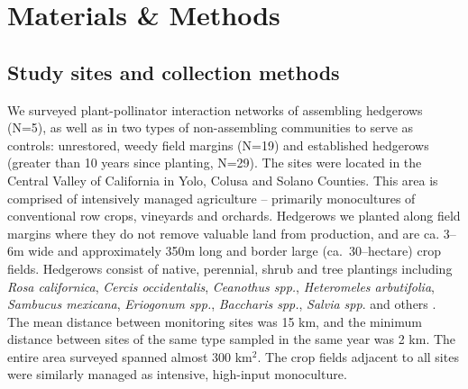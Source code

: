 \documentclass[12pt]{article}
\begin{document}




\section*{Materials \& Methods}
\label{sec:methods}

\subsection*{Study sites and collection methods}
\label{sec:study-sites}

We surveyed plant-pollinator interaction networks of assembling
hedgerows (N=5), as well as in two types of non-assembling communities
to serve as controls: unrestored, weedy field margins (N=19) and
established hedgerows (greater than 10 years since planting,
N=29). The sites were located in the Central Valley of California in
Yolo, Colusa and Solano Counties. This area is comprised of
intensively managed agriculture -- primarily monocultures of
conventional row crops, vineyards and orchards. Hedgerows we planted
along field margins where they do not remove valuable land from
production, and are ca. 3--6m wide and approximately 350m long and
border large (ca.\ 30--hectare) crop fields. Hedgerows consist of
native, perennial, shrub and tree plantings including \textit{Rosa
  californica}, \textit{Cercis occidentalis}, \textit{Ceanothus spp.},
\textit{Heteromeles arbutifolia}, \textit{Sambucus mexicana},
\textit{Eriogonum spp.}, \textit{Baccharis spp.}, \textit{Salvia
  spp}. and others \citep{kremen-2015-602, mgonigle-2015-x}. The mean
distance between monitoring sites was 15 km, and the minimum distance
between sites of the same type sampled in the same year was 2 km.  The
entire area surveyed spanned almost 300 km$^2$. The crop fields
adjacent to all sites were similarly managed as intensive, high-input
monoculture.
\end{document}
